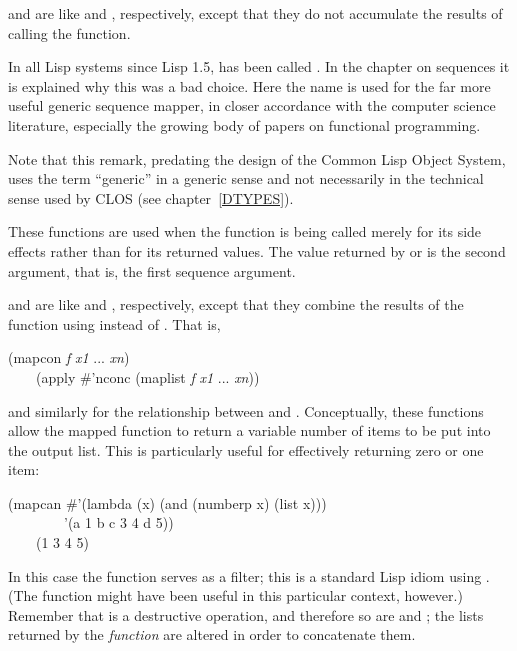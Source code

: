 \begin{defun}[Function]
 and  are like  and ,
respectively, except that they do not accumulate the results
of calling the function.

\beforenoterule
\begin{incompatibility}
In all Lisp systems since Lisp 1.5,
 has been called .  In the chapter on sequences
it is explained why this was a bad choice.  Here the name 
is used for the far more useful generic sequence mapper,
in closer accordance with the computer science literature,
especially the growing body of papers on functional programming.
\begin{new}
Note that this remark, predating the design of the Common Lisp Object System,
uses the term ``generic'' in a generic sense and not necessarily
in the technical sense used by CLOS
(see chapter~\ref{DTYPES}).
\end{new}
\end{incompatibility}
\afternoterule

These functions are used when the function is being called merely for its
side effects rather than for its returned values.
The value returned by  or  is the second argument,
that is, the first sequence argument.

 and  are like  and , respectively,
except that they combine the results of
the function using  instead of .  That is,
\begin{lisp}
(mapcon \emph{f} \emph{x1} ... \emph{xn}) \\
~~~\EQ\ (apply \#'nconc (maplist \emph{f} \emph{x1} ... \emph{xn}))
\end{lisp}
and similarly for the relationship between  and .
Conceptually, these functions allow the mapped function to return
a variable number of items to be put into the output list.
This is particularly useful for effectively returning zero or one item:
\begin{lisp}
(mapcan \#'(lambda (x) (and (numberp x) (list x))) \\
~~~~~~~~'(a 1 b c 3 4 d 5)) \\
~~~\EV\ (1 3 4 5)
\end{lisp}
In this case the function serves as a filter; this is a standard Lisp
idiom using .
(The function  might have been useful in this
particular context, however.)
Remember that  is a destructive operation, and therefore
so are  and ; the lists returned by the \emph{function}
are altered in order to concatenate them.


\end{defun}

